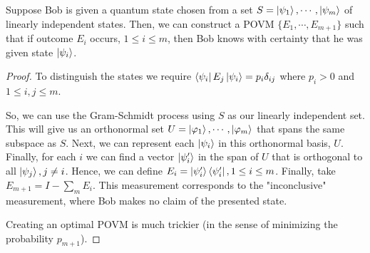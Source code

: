 \documentclass[main.tex]{subfiles}
\begin{document}
%
%
%
%
\begin{proposition} Suppose Bob is given a quantum state chosen from a set $S = \ket{\psi_1} , \cdots , \ket{\psi_m}$ of linearly independent states. Then, we can construct a POVM $\{ E_1 , \cdots , E_{m+1} \}$ such that if outcome $E_i$ occurs, $1 \leq i \leq m$, then Bob knows with certainty that he was given state $\ket{\psi_i}$.

\begin{proof}
To distinguish the states we require $\bra{\psi_i} E_j \ket{\psi_i} = p_i \delta_{ij}$ where $p_i > 0$ and $1 \leq i,j \leq m$.

So, we can use the Gram-Schmidt process using $S$ as our linearly independent set. This will give us an orthonormal set $U = \ket{\varphi_1} , \cdots , \ket{\varphi_m}$ that spans the same subspace as $S$. Next, we can represent each $\ket{\psi_i}$ in this orthonormal basis, $U$. Finally, for each $i$ we can find a vector $\ket{\psi'_i}$ in the span of $U$ that is orthogonal to all $\ket{\psi_j}, j \neq i$. Hence, we can define $E_i = \ket{\psi_i'} \bra{\psi_i'}, 1 \leq i \leq m$. Finally, take $E_{m+1} = I - \sum_m E_i$. This measurement corresponds to the "inconclusive" measurement, where Bob makes no claim of the presented state.

Creating an optimal POVM is much trickier (in the sense of minimizing the probability $p_{m+1}$).
\end{proof}
\end{proposition}
\end{document}
